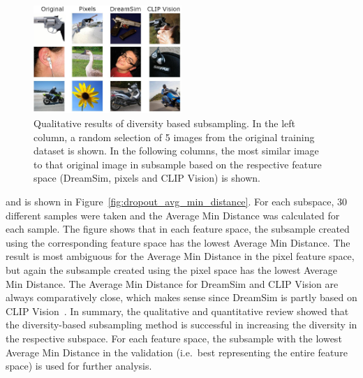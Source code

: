 \begin{figure}[ht]
  \centering
  \includegraphics[width=0.5\textwidth]{plots/dropout_similarity_plot.JPEG}
  \caption[Qualitative results of diversity based subsampling]{Qualitative results of diversity based subsampling. In the left column, a random selection of 5 images from the original training dataset is shown. In the following columns, the most similar image to that original image in subsample based on the respective feature space (DreamSim, pixels and CLIP Vision) is shown.}\label{fig:dropout_similarity_plot}
\end{figure}

and is shown in Figure~\ref{fig:dropout_avg_min_distance}. For each subspace, 30 different samples were taken and the Average Min Distance was calculated for each sample. The figure shows that in each feature space, the subsample created using the corresponding feature space has the lowest Average Min Distance. The result is most ambiguous for the Average Min Distance in the pixel feature space, but again the subsample created using the pixel space has the lowest Average Min Distance. The Average Min Distance for DreamSim and CLIP Vision are always comparatively close, which makes sense since DreamSim is partly based on CLIP Vision~\cite{fuDreamSimLearningNew2023}. In summary, the qualitative and quantitative review showed that the diversity-based subsampling method is successful in increasing the diversity in the respective subspace. For each feature space, the subsample with the lowest Average Min Distance in the validation (i.e.\ best representing the entire feature space) is used for further analysis.

